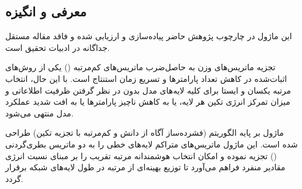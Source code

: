 \subsection{معرفی و انگیزه}
این ماژول در چارچوب پژوهش حاضر پیاده‌سازی و ارزیابی شده و فاقد مقاله مستقل جداگانه در ادبیات تحقیق است.

تجزیه ماتریس‌های وزن به حاصل‌ضرب ماتریس‌های کم‌مرتبه () یکی از روش‌های اثبات‌شده در کاهش تعداد پارامترها و تسریع زمان استنتاج است. با این حال، انتخاب مرتبه یکسان و ایستا برای کلیه لایه‌های مدل بدون در نظر گرفتن ظرفیت اطلاعاتی و میزان تمرکز انرژی تکین هر لایه، یا به کاهش ناچیز پارامترها یا به افت شدید عملکرد مدل منتهی می‌شود.

ماژول  بر پایه الگوریتم  (فشرده‌ساز آگاه از دانش و کم‌مرتبه با تجزیه تکین) طراحی شده است. این ماژول ماتریس‌های متراکم لایه‌های خطی را به دو ماتریس بطری‌گردنی () تجزیه نموده و امکان انتخاب هوشمندانه مرتبه تقریب را بر مبنای نسبت انرژی مقادیر منفرد فراهم می‌آورد تا توزیع بهینه‌ای از مرتبه در طول لایه‌های شبکه برقرار گردد.
